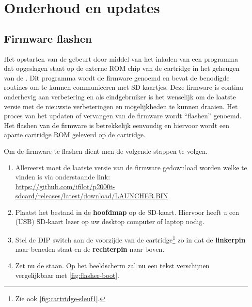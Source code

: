 \chapter{Onderhoud en updates}
\chapterpreamble

%
%
%
\section{Firmware flashen}
\label{sec:firmware-flash}


Het opstarten van de \product gebeurt door middel van het inladen van een programma dat opgeslagen staat op de externe ROM chip van de  cartridge in het geheugen van de . Dit programma wordt de firmware genoemd en bevat de benodigde routines om te kunnen communiceren met SD-kaartjes. Deze firmware is continu onderhevig aan verbetering en als eindgebruiker is het wenselijk om de laatste versie met de nieuwste verbeteringen en mogelijkheden te kunnen draaien. Het proces van het updaten of vervangen van de firmware wordt ``flashen'' genoemd. Het flashen van de firmware is betrekkelijk eenvoudig en hiervoor wordt een aparte cartridge ROM geleverd op de  cartridge.

Om de firmware te flashen dient men de volgende stappen te volgen. 

\begin{enumerate}[noitemsep]
    \item Allereerst moet de laatste versie van de firmware gedownload worden welke te vinden is via onderstaande link:\\
    \url{https://github.com/ifilot/p2000t-sdcard/releases/latest/download/LAUNCHER.BIN}
    \item Plaatst het bestand  in de \textbf{hoofdmap} op de SD-kaart. Hiervoor heeft u een (USB) SD-kaart lezer op uw desktop computer of laptop nodig.
    \item Stel de DIP switch aan de voorzijde van de  cartridge\footnote{Zie ook \cref{fig:cartridge-sleuf1}.} zo in dat de \textbf{linkerpin} naar beneden staat en de \textbf{rechterpin} naar boven.
    \item Zet nu de  staan. Op het beeldscherm zal nu een tekst verschijnen vergelijkbaar met \cref{fig:flasher-boot}.
\end{enumerate}

